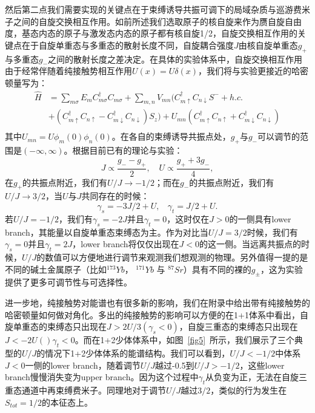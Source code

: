 然后第二点我们需要实现的关键点在于束缚诱导共振可调下的局域杂质与巡游费米子之间的自旋交换相互作用\cite{ono2019antiferromagnetic,zhang2016kondo,cheng2017enhancing,zhang2018control,ji2018confinement,zhang2020tight}。如前所述我们选取原子的核自旋来作为赝自旋自由度，基态内态的原子与激发态内态的原子都有核自旋1/2，自旋交换相互作用的关键点在于自旋单重态与多重态的散射长度不同，自旋耦合强度$J$由核自旋单重态$g_+$与多重态$g_-$之间的散射长度之差决定\cite{scazza2014observation,cappellini2014direct,ono2019antiferromagnetic}。在具体的实验体系中，自旋交换相互作用由于经常伴随着纯接触势相互作用$U(x)=U\delta(x)$，我们将与实验更接近的哈密顿量写为：
\begin{equation}
\begin{split}
     \hat{H} &= \sum_{m\sigma}E_m C_{m\sigma}^\dagger C_{m\sigma} + \sum_{m,n} V_{mn} ( C_{m\uparrow}^\dagger  C_{n\downarrow} S^- + h.c. \\
     & +   (C_{m\uparrow}^\dagger  C_{n\uparrow}-C_{m\downarrow}^\dagger  C_{n\downarrow}) S_z )+U_{mn} (C_{m\uparrow}^\dagger  C_{n\uparrow}+C_{m\downarrow}^\dagger  C_{n\downarrow})\\
\end{split}  \label{H_U}
\end{equation}
其中$U_{mn}=U\phi_m(0)\phi_n(0)$。在各自的束缚诱导共振点处，$g_+$与$g_-$可以调节的范围是$(-\infty,\infty)$。根据目前已有的理论与实验：
\begin{equation}
J \propto \frac{g_- -g_+}{2} ,\quad U \propto \frac{g_++3g_-}{4},
\end{equation}
在$g_+$的共振点附近，我们有$U/J\to-1/2$；而在$g_-$的共振点附近，我们有$U/J\to3/2$，当$U$与$J$共同存在的时候：
\begin{equation} 
\gamma_s=-3J/2+U,\ \ \ \ \gamma_t=J/2+U. \label{eff_gamma}
\end{equation}
若$U/J=-1/2$，我们有$\gamma_s=-2J$并且$\gamma_t=0$，这时仅在$J>0$的一侧具有lower branch，其能量以自旋单重态束缚态为主。作为对比当$U/J=3/2$时候，我们有$\gamma_s=0$并且$\gamma_t=2J$，lower branch将仅仅出现在$J<0$的这一侧。当远离共振点的时候，$U/J$的数值可以方便地进行调节来观测我们想观测的物理。另外值得一提的是不同的碱土金属原子（比如${}^{173}Yb$， ${}^{171}Yb$ 与 ${}^{87}Sr$）具有不同的裸的$g_{\pm}$，这为实验提供了更多可调节性与可选择性。


进一步地，纯接触势对能谱也有很多新的影响，{\color{red}我们在附录中给出带有纯接触势的哈密顿量如何做对角化。}多出的纯接触势的影响可以方便的在1+1体系中看出，自旋单重态的束缚态只出现在$J>2U/3(\gamma_s<0)$，自旋三重态的束缚态只出现在$J<-2U()\gamma_t<0$。而在1+2少体体系中，如图~\ref{fig5}~所示，我们展示了三个典型的$U/J$的情况下1+2少体体系的能谱结构。我们可以看到，$U/J<-1/2$中体系$J<0$一侧的lower branch，随着调节$U/J$越过-0.5到$U/J>-1/2$，这些lower branch慢慢消失变为upper branch。因为这个过程中$\gamma_t$从负变为正，无法在自旋三重态通道中再束缚费米子。同理地对于调节$U/J$越过$3/2$，类似的行为发生在$S_{tot}=1/2$的本征态上。


